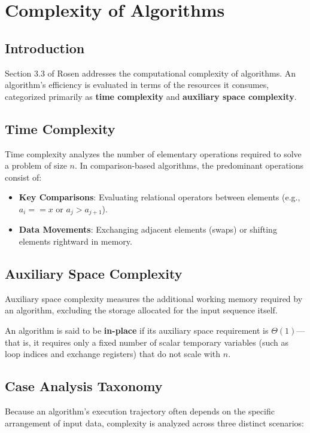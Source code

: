 \chapter{Complexity of Algorithms}
\label{chap:complexity}

\section{Introduction}
Section 3.3 of Rosen \cite{rosen2019discrete} addresses the computational complexity of algorithms. An algorithm's efficiency is evaluated in terms of the resources it consumes, categorized primarily as \textbf{time complexity} and \textbf{auxiliary space complexity}.

\section{Time Complexity}
Time complexity analyzes the number of elementary operations required to solve a problem of size $n$. In comparison-based algorithms, the predominant operations consist of:
\begin{itemize}
    \item \textbf{Key Comparisons}: Evaluating relational operators between elements (e.g., $a_i == x$ or $a_j > a_{j+1}$).
    \item \textbf{Data Movements}: Exchanging adjacent elements (swaps) or shifting elements rightward in memory.
\end{itemize}

\section{Auxiliary Space Complexity}
Auxiliary space complexity measures the additional working memory required by an algorithm, excluding the storage allocated for the input sequence itself. 
\begin{definition}
An algorithm is said to be \textbf{in-place} if its auxiliary space requirement is $\Theta(1)$—that is, it requires only a fixed number of scalar temporary variables (such as loop indices and exchange registers) that do not scale with $n$.
\end{definition}

\section{Case Analysis Taxonomy}
Because an algorithm's execution trajectory often depends on the specific arrangement of input data, complexity is analyzed across three distinct scenarios:

